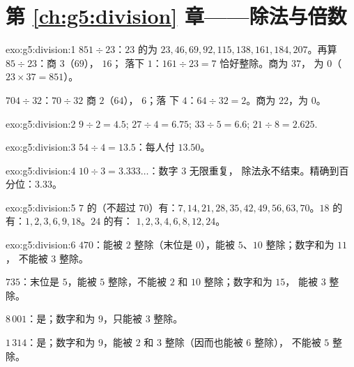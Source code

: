 \section*{第 \ref{ch:g5:division} 章——除法与倍数}

\begin{solution}{exo:g5:division:1}
$851 \div 23$：$23$ 的为 $23, 46, 69, 92, 115, 138, 161,
184, 207$。再算 $85 \div 23$：商 $3$（$69$）， $16$；
落下 $1$：$161 \div 23 = 7$ 恰好整除。商为 $37$，
为 $0$（$23 \times 37 = 851$）。

$704 \div 32$：$70 \div 32$ 商 $2$（$64$）， $6$；落
下 $4$：$64 \div 32 = 2$。商为 $22$，为 $0$。
\end{solution}

\begin{solution}{exo:g5:division:2}
$9 \div 2 = 4.5$; \quad $27 \div 4 = 6.75$; \quad
$33 \div 5 = 6.6$; \quad $21 \div 8 = 2.625$.
\end{solution}

\begin{solution}{exo:g5:division:3}
$54 \div 4 = 13.5$：每人付 $13.50$。
\end{solution}

\begin{solution}{exo:g5:division:4}
$10 \div 3 = 3.333\dots$：数字 $3$ 无限重复，
除法永不结束。精确到百分位：$3.33$。
\end{solution}

\begin{solution}{exo:g5:division:5}
$7$ 的（不超过 $70$）有：$7, 14, 21, 28, 35, 42, 49, 56, 63,
70$。$18$ 的有：$1, 2, 3, 6, 9, 18$。$24$ 的有：
$1, 2, 3, 4, 6, 8, 12, 24$。
\end{solution}

\begin{solution}{exo:g5:division:6}
$470$：能被 $2$ 整除（末位是 $0$），能被 $5$、$10$ 整除；数字和为 $11$，
不能被 $3$ 整除。

$735$：末位是 $5$，能被 $5$ 整除，不能被 $2$ 和 $10$ 整除；数字和为 $15$，
能被 $3$ 整除。

$8\,001$：是；数字和为 $9$，只能被 $3$ 整除。

$1\,314$：是；数字和为 $9$，能被 $2$ 和 $3$ 整除（因而也能被 $6$ 整除），
不能被 $5$ 整除。
\end{solution}

